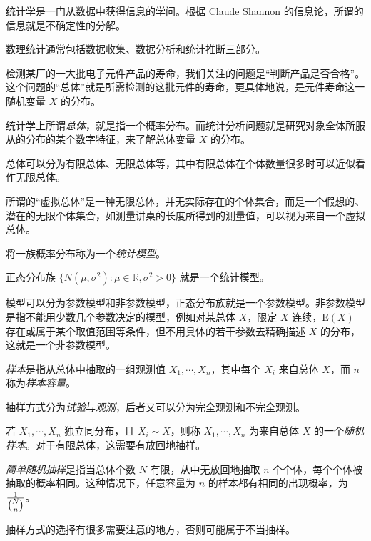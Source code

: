 \documentclass[../main.tex]{subfiles}
\begin{document}
统计学是一门从数据中获得信息的学问。根据 Claude Shannon 的信息论，所谓的信息就是不确定性的分解。

数理统计通常包括数据收集、数据分析和统计推断三部分。


\begin{example*}
    检测某厂的一大批电子元件产品的寿命，我们关注的问题是“判断产品是否合格”。这个问题的“总体”就是所需检测的这批元件的寿命，更具体地说，是元件寿命这一随机变量 $X$ 的分布。
\end{example*}

统计学上所谓\emph{总体}，就是指一个概率分布。而统计分析问题就是研究对象全体所服从的分布的某个数字特征，来了解总体变量 $X$ 的分布。

总体可以分为有限总体、无限总体等，其中有限总体在个体数量很多时可以近似看作无限总体。

所谓的“虚拟总体”是一种无限总体，并无实际存在的个体集合，而是一个假想的、潜在的无限个体集合，如测量讲桌的长度所得到的测量值，可以视为来自一个虚拟总体。

将一族概率分布称为一个\emph{统计模型}。

\begin{example*}
    正态分布族 $\{N(\mu,\sigma^2):\mu\in\mathbb R,\sigma^2>0\}$ 就是一个统计模型。
\end{example*}

模型可以分为参数模型和非参数模型，正态分布族就是一个参数模型。非参数模型是指不能用少数几个参数决定的模型，例如对某总体 $X$，限定 $X$ 连续，$\mathrm E(X)$ 存在或属于某个取值范围等条件，但不用具体的若干参数去精确描述 $X$ 的分布，这就是一个非参数模型。

\emph{样本}是指从总体中抽取的一组观测值 $X_1,\cdots,X_n$，其中每个 $X_i$ 来自总体 $X$，而 $n$ 称为\emph{样本容量}。

抽样方式分为\emph{试验}与\emph{观测}，后者又可以分为完全观测和不完全观测。


若 $X_1,\cdots,X_n$ 独立同分布，且 $X_i\sim X$，则称 $X_1,\cdots,X_n$ 为来自总体 $X$ 的一个\emph{随机样本}。对于有限总体，这需要有放回地抽样。

\emph{简单随机抽样}是指当总体个数 $N$ 有限，从中无放回地抽取 $n$ 个个体，每个个体被抽取的概率相同。这种情况下，任意容量为 $n$ 的样本都有相同的出现概率，为 $\frac1{\tbinom Nn}$。

抽样方式的选择有很多需要注意的地方，否则可能属于不当抽样。
\end{document}
